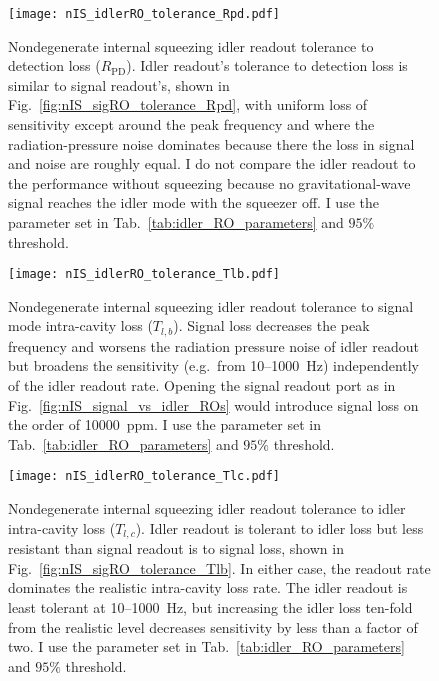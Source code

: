 \begin{figure}
    \centering
    \texttt{[image: nIS\_idlerRO\_tolerance\_Rpd.pdf]} 
    \caption{Nondegenerate internal squeezing idler readout tolerance to detection loss ($R_\text{PD}$). Idler readout's tolerance to detection loss is similar to signal readout's, shown in Fig.~\ref{fig:nIS_sigRO_tolerance_Rpd}, with uniform loss of sensitivity except around the peak frequency and where the radiation-pressure noise dominates because there the loss in signal and noise are roughly equal. I do not compare the idler readout to the performance without squeezing because no gravitational-wave signal reaches the idler mode with the squeezer off. I use the parameter set in Tab.~\ref{tab:idler_RO_parameters} and $95\%$ threshold.}
    \label{fig:nIS_idlerRO_tolerance_Rpd}
\end{figure}
\begin{figure}
	\centering
	\texttt{[image: nIS\_idlerRO\_tolerance\_Tlb.pdf]}
	\caption{ Nondegenerate internal squeezing idler readout tolerance to signal mode intra-cavity loss ($T_{l,b}$). Signal loss decreases the peak frequency and worsens the radiation pressure noise of idler readout but broadens the sensitivity (e.g.\ from 10--1000~Hz) independently of the idler readout rate. Opening the signal readout port as in Fig.~\ref{fig:nIS_signal_vs_idler_ROs} would introduce signal loss on the order of 10000~ppm. I use the parameter set in Tab.~\ref{tab:idler_RO_parameters} and $95\%$ threshold.}
	\label{fig:nIS_idlerRO_tolerance_Tlb}
\end{figure}
\begin{figure}[t]
	\centering
	\texttt{[image: nIS\_idlerRO\_tolerance\_Tlc.pdf]}
	\caption{ Nondegenerate internal squeezing idler readout tolerance to idler intra-cavity loss ($T_{l,c}$). Idler readout is tolerant to idler loss but less resistant than signal readout is to signal loss, shown in Fig.~\ref{fig:nIS_sigRO_tolerance_Tlb}. In either case, the readout rate dominates the realistic intra-cavity loss rate. The idler readout is least tolerant at 10--1000~Hz, but increasing the idler loss ten-fold from the realistic level decreases sensitivity by less than a factor of two. %
    I use the parameter set in Tab.~\ref{tab:idler_RO_parameters} and $95\%$ threshold.}
	\label{fig:nIS_idlerRO_tolerance_Tlc}
\end{figure}
